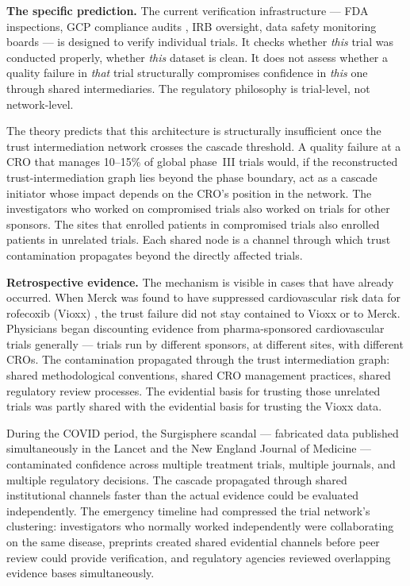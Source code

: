 \documentclass[11pt,a4paper]{article}
\begin{document}
\textbf{The specific prediction.} The current verification infrastructure --- FDA inspections, GCP compliance audits \cite{ich2025}, IRB oversight, data safety monitoring boards --- is designed to verify individual trials. It checks whether \emph{this} trial was conducted properly, whether \emph{this} dataset is clean. It does not assess whether a quality failure in \emph{that} trial structurally compromises confidence in \emph{this} one through shared intermediaries. The regulatory philosophy is trial-level, not network-level.

The theory predicts that this architecture is structurally insufficient once the trust intermediation network crosses the cascade threshold. A quality failure at a CRO that manages 10--15\% of global phase~III trials would, if the reconstructed trust-intermediation graph lies beyond the phase boundary, act as a cascade initiator whose impact depends on the CRO's position in the network. The investigators who worked on compromised trials also worked on trials for other sponsors. The sites that enrolled patients in compromised trials also enrolled patients in unrelated trials. Each shared node is a channel through which trust contamination propagates beyond the directly affected trials.

\textbf{Retrospective evidence.} The mechanism is visible in cases that have already occurred. When Merck was found to have suppressed cardiovascular risk data for rofecoxib (Vioxx) \cite{topol2004}, the trust failure did not stay contained to Vioxx or to Merck. Physicians began discounting evidence from pharma-sponsored cardiovascular trials generally --- trials run by different sponsors, at different sites, with different CROs. The contamination propagated through the trust intermediation graph: shared methodological conventions, shared CRO management practices, shared regulatory review processes. The evidential basis for trusting those unrelated trials was partly shared with the evidential basis for trusting the Vioxx data.

During the COVID period, the Surgisphere scandal --- fabricated data published simultaneously in the Lancet and the New England Journal of Medicine \cite{mehra2020} --- contaminated confidence across multiple treatment trials, multiple journals, and multiple regulatory decisions. The cascade propagated through shared institutional channels faster than the actual evidence could be evaluated independently. The emergency timeline had compressed the trial network's clustering: investigators who normally worked independently were collaborating on the same disease, preprints created shared evidential channels before peer review could provide verification, and regulatory agencies reviewed overlapping evidence bases simultaneously.
\end{document}
